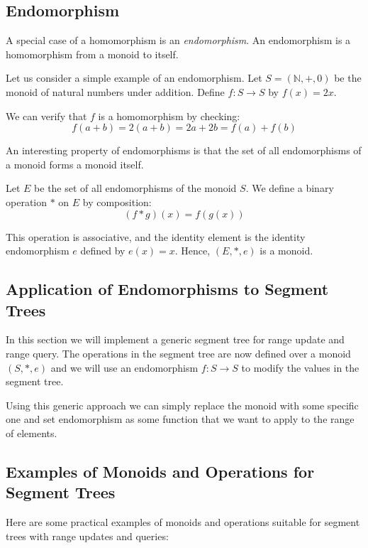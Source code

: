 \documentclass[11pt]{article}
\begin{document}
\subsection{Endomorphism}

A special case of a homomorphism is an \emph{endomorphism}.  
An endomorphism is a homomorphism from a monoid to itself.

Let us consider a simple example of an endomorphism.  
Let \( S = (\mathbb{N}, +, 0) \) be the monoid of natural numbers under addition.  
Define \( f: S \to S \) by \( f(x) = 2x \).

We can verify that \( f \) is a homomorphism by checking:
\[
    f(a + b) = 2(a + b) = 2a + 2b = f(a) + f(b)
\]

An interesting property of endomorphisms is that the set of all endomorphisms of a monoid forms a monoid itself.

Let \( E \) be the set of all endomorphisms of the monoid \( S \).  
We define a binary operation \( \ast \) on \( E \) by composition:
\[
    (f \ast g)(x) = f(g(x))
\]

This operation is associative, and the identity element is the identity endomorphism \( e \) defined by \( e(x) = x \).  
Hence, \( (E, \ast, e) \) is a monoid.

\subsection{Application of Endomorphisms to Segment Trees}
In this section we will implement a generic segment tree for range update and range query.
The operations in the segment tree are now defined over a monoid \( (S, \ast, e) \) and we will use an endomorphism \( f: S \to S \) to modify the values in the segment tree.



\vspace{0.1cm}
\FloatBarrier
Using this generic approach we can simply replace the monoid with some specific one and
set endomorphism as some function that we want to apply to the range of elements.

\subsection{Examples of Monoids and Operations for Segment Trees}

Here are some practical examples of monoids and operations suitable for segment trees with range updates and queries:
\end{document}
